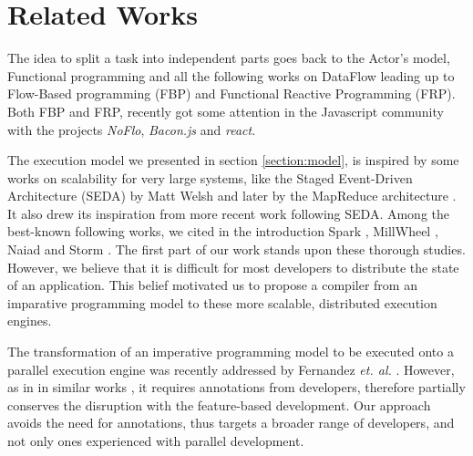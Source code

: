 \section{Related Works} \label{section:related}

The idea to split a task into independent parts goes back to the Actor's model, Functional programming and all the following works on DataFlow leading up to Flow-Based programming (FBP) and Functional Reactive Programming (FRP).
Both FBP and FRP, recently got some attention in the Javascript community with the projects \textit{NoFlo}, \textit{Bacon.js} and \textit{react}.

The execution model we presented in section \ref{section:model}, is inspired by some works on scalability for very large systems, like the Staged Event-Driven Architecture (SEDA) by Matt Welsh \cite{Welsh2000} and later by the MapReduce architecture \cite{Dean2008}.
It also drew its inspiration from more recent work following SEDA.
Among the best-known following works, we cited in the introduction Spark \cite{Zaharia2012}, MillWheel \cite{Akidau2013}, Naiad \cite{McSherry} and Storm \cite{Toshniwal2014}.
The first part of our work stands upon these thorough studies.
However, we believe that it is difficult for most developers to distribute the state of an application.
This belief motivated us to propose a compiler from an imparative programming model to these more scalable, distributed execution engines.


The transformation of an imperative programming model to be executed onto a parallel execution engine was recently addressed by Fernandez \textit{et. al.} \cite{Fernandez2014a}.
However, as in in similar works \cite{Power2010}, it requires annotations from developers, therefore partially conserves the disruption with the feature-based development.
Our approach avoids the need for annotations, thus targets a broader range of developers, and not only ones experienced with parallel development.

